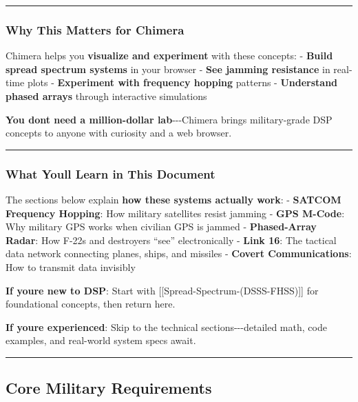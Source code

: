 \begin{center}\rule{0.5\linewidth}{0.5pt}\end{center}

\subsubsection{Why This Matters for
Chimera}\label{why-this-matters-for-chimera}

Chimera helps you \textbf{visualize and experiment} with these concepts:
- \textbf{Build spread spectrum systems} in your browser - \textbf{See
jamming resistance} in real-time plots - \textbf{Experiment with
frequency hopping} patterns - \textbf{Understand phased arrays} through
interactive simulations

\textbf{You don\textquotesingle t need a million-dollar
lab}-\/-\/-Chimera brings military-grade DSP concepts to anyone with
curiosity and a web browser.

\begin{center}\rule{0.5\linewidth}{0.5pt}\end{center}

\subsubsection{What You\textquotesingle ll Learn in This
Document}\label{what-youll-learn-in-this-document}

The sections below explain \textbf{how these systems actually work}: -
\textbf{SATCOM Frequency Hopping}: How military satellites resist
jamming - \textbf{GPS M-Code}: Why military GPS works when civilian GPS
is jammed - \textbf{Phased-Array Radar}: How F-22s and destroyers
``see'' electronically - \textbf{Link 16}: The tactical data network
connecting planes, ships, and missiles - \textbf{Covert Communications}:
How to transmit data invisibly

\textbf{If you\textquotesingle re new to DSP}: Start with
{[}{[}Spread-Spectrum-(DSSS-FHSS){]}{]} for foundational concepts, then
return here.

\textbf{If you\textquotesingle re experienced}: Skip to the technical
sections-\/-\/-detailed math, code examples, and real-world system specs
await.

\begin{center}\rule{0.5\linewidth}{0.5pt}\end{center}

\subsection{\texorpdfstring{ Core Military
Requirements}{ Core Military Requirements}}\label{core-military-requirements}

